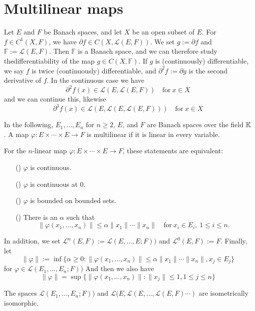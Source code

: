 \section{Multilinear maps}
Let $E$ and $F$ be Banach spaces, and let $X$ be an open subset of $E$. For $f\in C^1(X,F)$, we have $\partial f\in C(X,\mathcal{L}(E,F))$. We set $g:=\partial f$ and $\mathbb{F}:=\mathcal{L}(E,F)$. Then $\mathbb{F}$ is a Banach space, and we can therefore study thedifferentiability of the map $g\in C(X,\mathbb{F})$. If $g$ is (continuously) differentiable, we say $f$ is twice (continuously) differentiable, and $\partial^2f:=\partial g$ is the second derivative of $f$. In the continuous case we have
\[\partial^2f(x)\in\mathcal{L}(E,\mathcal{L}(E,F))\quad\text{for}\ x\in X\]
and we can continue this, likewise
\[\partial^3f(x)\in\mathcal{L}(E,\mathcal{L}(E,\mathcal{L}(E,F)))\quad\text{for}\ x\in X\]
\begin{definition}
In the following, $E_1,\dots,E_n$ for $n\geq2$, $E$, and $F$ are Banach spaces over the field $\mathbb{K}$. A map $\varphi:E\times\cdots\times E\to F$ is multilinear if it is linear in every variable.
\end{definition}
\begin{proposition}
For the $n$-linear map $\varphi:E\times\cdots\times E\to F$, these statements
are equivalent:
\begin{itemize}
\item[(\rmnum{1})]$\varphi$ is continuous.
\item[(\rmnum{2})]$\varphi$ is continuous at $0$.
\item[(\rmnum{3})]$\varphi$ is bounded on bounded sets.
\item[(\rmnum{4})]There is an $\alpha$ such that
\[\|\varphi(x_1,\dots,x_n)\|\leq\alpha\|x_1\|\cdots\|x_n\|\quad\text{for}\ x_i\in E_i,\ 1\leq i\leq n.\]
\end{itemize}
In addition, we set $\mathcal{L}^{n}(E,F):=\mathcal{L}(E,\dots,E;F))$ and $\mathcal{L}^{0}(E,F):=F$. Finally, let
\[\|\varphi\|:=\inf\{\alpha\geq 0:\|\varphi(x_1,\dots,x_n)\|\leq\alpha\|x_1\|\cdots\|x_n\|, x_j\in E_j\}\]
for $\varphi \in\mathcal{L}(E_1,\dots,E_n;F))$
And then we also have
\[\|\varphi\|=\sup\{\|\varphi(x_1,\dots,x_n)\|:\|x_j\|\leq 1, 1\leq j\leq n\}\]
\end{proposition}
\begin{theorem}
The spaces $\mathcal{L}(E_1,\dots,E_n;F))$ and $\mathcal{L}(E,\mathcal{L}(E,\dots,\mathcal{L}(E,F)\cdots)$ are isometrically isomorphic.
\end{theorem}
